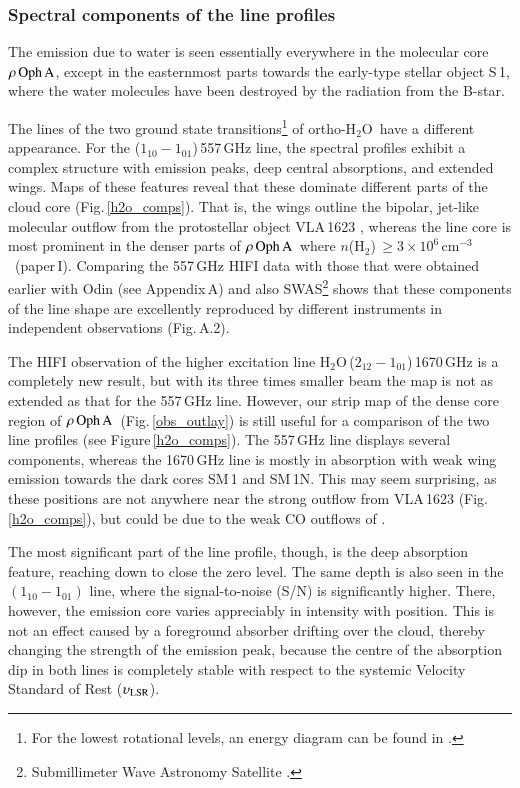 \documentclass{aa}
\newcommand{\cmthree}{cm$^{-3}$}
\newcommand{\vlsr}{$\upsilon_{\rm LSR}$}        %
\newcommand{\molh}{H$_{2}$}                              %
\newcommand{\water}{H$_{2}$O}
\newcommand{\roa}{$\rho \, {\rm Oph \, A}$}
\begin{document}
\subsubsection{Spectral components of the line profiles}

The emission due to water is seen essentially everywhere in the molecular core \roa, except in the easternmost parts towards the early-type stellar object S\,1, where the water molecules have been destroyed by the radiation from the B-star. 

The lines of the two ground state transitions\footnote{For the lowest rotational levels, an energy diagram can be found in \citet{ewine2011}.} of ortho-\water\ have a different appearance. For  the ($1_{10}-1_{01}$)\,557\,GHz line, the spectral profiles exhibit a complex structure with emission peaks, deep central absorptions, and extended wings. Maps of these features reveal that these dominate different parts of the cloud core (Fig.\,\ref{h2o_comps}). That is, the wings outline the bipolar, jet-like molecular outflow from the protostellar object VLA\,1623 \citep{bjerkeli2012}, whereas the line core is most prominent in the denser parts of \roa\  where $n$(\molh)\,$\ge 3 \times 10^6$\,\cmthree\ (paper\,I). Comparing the 557\,GHz HIFI data with those that were obtained earlier with Odin (see Appendix\,A) and also SWAS\footnote{Submillimeter Wave Astronomy Satellite \citep[SWAS,][]{melnick2000}.} shows that these components of the line shape are excellently reproduced by different instruments in independent observations (Fig.\,A.2).

The HIFI observation of the higher excitation line \water\,($2_{12}-1_{01}$)\,1670\,GHz is a completely new result, but with its three times smaller beam the map is not as extended as that for the 557\,GHz line. However, our strip map of the dense core region of \roa\ (Fig.\,\ref{obs_outlay}) is still useful for a comparison of the two line profiles (see Figure\,\ref{h2o_comps}).  The 557\,GHz line displays several components, whereas the 1670\,GHz line is mostly in absorption with weak wing emission towards the dark cores SM\,1 and SM\,1N. This may seem surprising, as these positions are not anywhere near the strong outflow from VLA\,1623 (Fig.\,\ref{h2o_comps}), but could be due to the weak CO outflows of \citet{kamazaki2003}.

The most significant part of the line profile, though, is the deep absorption feature, reaching down to close the zero level. The same depth is also seen in the $(1_{10}-1_{01})$ line, where the signal-to-noise (S/N) is significantly higher. There, however, the emission core varies appreciably in intensity with position. This is not an effect caused by a foreground absorber drifting over the cloud, thereby changing the strength of the emission peak, because the centre of the absorption dip in both lines is completely stable with respect to the systemic Velocity Standard of Rest (\vlsr).  
\end{document}
